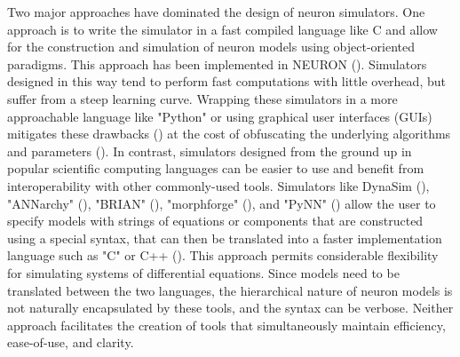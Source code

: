 \documentclass{frontiersSCNS} %
\begin{document}
Two major approaches have dominated the design of neuron simulators. One approach is to write the simulator in a fast compiled language like C and allow for the construction and simulation of neuron models using object-oriented paradigms. This approach has been implemented in NEURON (\cite{hinesNEURONSimulationEnvironment1997}). Simulators designed in this way tend to perform fast computations with little overhead, but suffer from a steep learning curve. Wrapping these simulators in a more approachable language like "Python"  or using graphical user interfaces (GUIs) mitigates these drawbacks (\cite{hinesNEURONPython2009}) at the cost of obfuscating the underlying algorithms and parameters (\cite{bretteSimulationNetworksSpiking2007, hinesNEURONPython2009}). In contrast, simulators designed from the ground up in popular scientific computing languages can be easier to use and benefit from interoperability with other commonly-used tools. Simulators like DynaSim (\cite{sherfeyDynaSimMATLABToolbox2018}), "ANNarchy" (\cite{vitayANNarchyCodeGeneration2015}), "BRIAN" (\cite{stimbergBrianSecondComing2013}), "morphforge" (\cite{hullMorphforgeToolboxSimulating2014}), and "PyNN" (\cite{davisonPyNNCommonInterface2009}) allow the user to specify models with strings of equations or components that are constructed using a special syntax, that can then be translated into a faster implementation language such as "C" or C++ (\cite{stimbergEquationorientedSpecificationNeural2014}). This approach permits considerable flexibility for simulating systems of differential equations. Since models need to be translated between the two languages, the hierarchical nature of neuron models is not naturally encapsulated by these tools, and the syntax can be verbose. Neither approach facilitates the creation of tools that simultaneously maintain efficiency, ease-of-use, and clarity.
\end{document}
